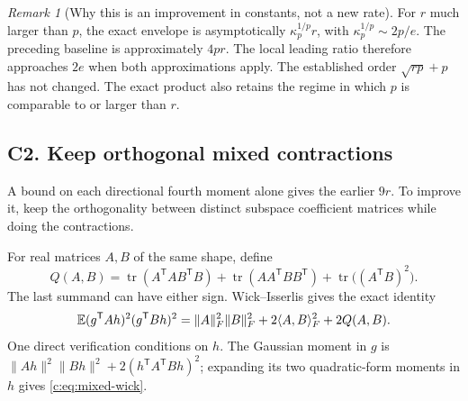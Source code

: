 \documentclass[11pt]{article}
\numberwithin{equation}{section}
\theoremstyle{definition}\newtheorem{definition}[theorem]{Definition}
\theoremstyle{remark}\newtheorem{remark}[theorem]{Remark}
\newcommand{\tr}{\operatorname{tr}}\newcommand{\Ent}{\operatorname{Ent}}
\newcommand{\norm}[1]{\lVert#1\rVert}\newcommand{\ip}[2]{\langle#1,#2\rangle}
\begin{document}
\begin{remark}[Why this is an improvement in constants, not a new rate]
For $r$ much larger than $p$, the exact envelope is asymptotically $\kappa_p^{1/p}r$, with $\kappa_p^{1/p}\sim2p/e$. The preceding baseline is approximately $4pr$. The local leading ratio therefore approaches $2e$ when both approximations apply. The established order $\sqrt{rp}+p$ has not changed. The exact product also retains the regime in which $p$ is comparable to or larger than $r$.
\end{remark}


\subsection{C2. Keep orthogonal mixed contractions}
A bound on each directional fourth moment alone gives the earlier $9r$. To improve it, keep the orthogonality between distinct subspace coefficient matrices while doing the contractions.

For real matrices $A,B$ of the same shape, define
\begin{equation}\label{c:eq:wick-Q}
 Q(A,B)=\tr(A^{\mathsf T}AB^{\mathsf T}B)
       +\tr(AA^{\mathsf T}BB^{\mathsf T})
       +\tr\big((A^{\mathsf T}B)^2\big).
\end{equation}
The last summand can have either sign. Wick--Isserlis gives the exact identity
\begin{equation}\label{c:eq:mixed-wick}
 \E(g^{\mathsf T}Ah)^2(g^{\mathsf T}Bh)^2
 =\norm A_F^2\norm B_F^2+2\ip{A}{B}_F^2+2Q(A,B).
\end{equation}
One direct verification conditions on $h$. The Gaussian moment in $g$ is
$\norm{Ah}^2\norm{Bh}^2+2(h^{\mathsf T}A^{\mathsf T}Bh)^2$;
expanding its two quadratic-form moments in $h$ gives \eqref{c:eq:mixed-wick}.
\end{document}
